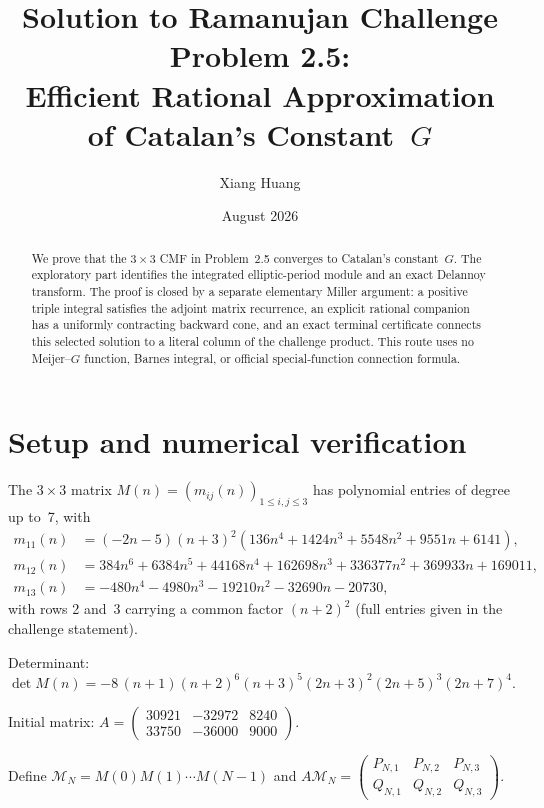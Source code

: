 \documentclass[11pt]{article}
\title{Solution to Ramanujan Challenge Problem 2.5:\\
Efficient Rational Approximation of Catalan's Constant~$G$}
\author{Xiang Huang}
\date{August 2026}
\begin{document}
\maketitle

\begin{abstract}
We prove that the $3\times3$ CMF in Problem~2.5 converges to
Catalan's constant~$G$.  The exploratory part identifies the
integrated elliptic-period module and an exact Delannoy transform.
The proof is closed by a separate elementary Miller argument: a
positive triple integral satisfies the adjoint matrix recurrence,
an explicit rational companion has a uniformly contracting backward
cone, and an exact terminal certificate connects this selected
solution to a literal column of the challenge product.  This route
uses no Meijer--$G$ function, Barnes integral, or official
special-function connection formula.
\end{abstract}

\section{Setup and numerical verification}

The $3\times 3$ matrix $M(n) = (m_{ij}(n))_{1\le i,j\le 3}$
has polynomial entries of degree up to~7, with
\begin{align*}
m_{11}(n) &= (-2n{-}5)(n{+}3)^2(136n^4{+}1424n^3{+}5548n^2{+}9551n{+}6141),\\
m_{12}(n) &= 384n^6{+}6384n^5{+}44168n^4{+}162698n^3{+}336377n^2{+}369933n{+}169011,\\
m_{13}(n) &= -480n^4{-}4980n^3{-}19210n^2{-}32690n{-}20730,
\end{align*}
with rows 2 and~3 carrying a common factor $(n{+}2)^2$ (full
entries given in the challenge statement).

Determinant:
\begin{equation}\label{eq:det}
\det M(n) = -8\,(n{+}1)(n{+}2)^6(n{+}3)^5(2n{+}3)^2(2n{+}5)^3(2n{+}7)^4.
\end{equation}

Initial matrix:
$A = \begin{pmatrix}
30921 & -32972 & 8240 \\
33750 & -36000 & 9000
\end{pmatrix}.$

Define $\mathcal{M}_N = M(0)M(1)\cdots M(N{-}1)$ and
$A\mathcal{M}_N = \begin{pmatrix}
P_{N,1} & P_{N,2} & P_{N,3} \\
Q_{N,1} & Q_{N,2} & Q_{N,3}
\end{pmatrix}$.
\end{document}
